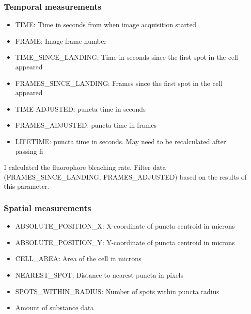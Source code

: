 \subsubsection{Temporal measurements}
\begin{itemize}
\item TIME: Time in seconds from when image acquisition started
\item FRAME: Image frame number
\item TIME\_SINCE\_LANDING: Time in seconds since the first spot in the cell appeared
\item FRAMES\_SINCE\_LANDING: Frames since the first spot in the cell appeared
\item TIME ADJUSTED: puncta time in seconds
\item FRAMES\_ADJUSTED: puncta time in frames
\item LIFETIME: puncta time in seconds. May need to be recalculated after passing fi
\end{itemize}

I calculated the fluorophore bleaching rate. Filter data (FRAMES\_SINCE\_LANDING, FRAMES\_ADJUSTED) based on the results of this parameter.

\subsubsection{Spatial measurements}
\begin{itemize}
\item ABSOLUTE\_POSITION\_X: X-coordinate of puncta centroid in microns
\item ABSOLUTE\_POSITION\_Y: Y-coordinate of puncta centroid in microns
\item CELL\_AREA: Area of the cell in microns
\item NEAREST\_SPOT: Distance to nearest puncta in pixels
\item SPOTS\_WITHIN\_RADIUS: Number of spots within puncta radius
\item Amount of substance data
\end{itemize}

